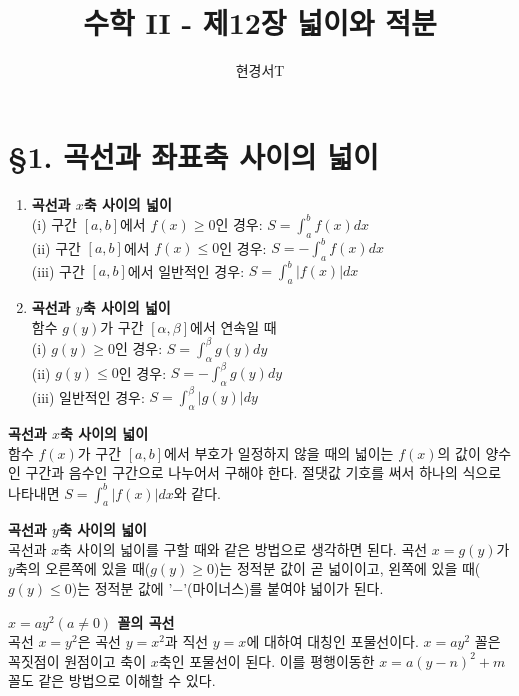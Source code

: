 \documentclass[a4paper,11pt]{article}
\title{\textbf{수학 II - 제12장 넓이와 적분}}
\author{현경서T}
\date{}
\begin{document}
\maketitle

\section*{§1. 곡선과 좌표축 사이의 넓이}

\begin{conceptbox}[기본 정석]
\begin{enumerate}
    \item \textbf{곡선과 $x$축 사이의 넓이}\\
    (i) 구간 $[a, b]$에서 $f(x) \ge 0$인 경우: $S = \int_{a}^{b} f(x) dx$\\
    (ii) 구간 $[a, b]$에서 $f(x) \le 0$인 경우: $S = -\int_{a}^{b} f(x) dx$\\
    (iii) 구간 $[a, b]$에서 일반적인 경우: $S = \int_{a}^{b} |f(x)| dx$
    \item \textbf{곡선과 $y$축 사이의 넓이}\\
    함수 $g(y)$가 구간 $[\alpha, \beta]$에서 연속일 때\\
    (i) $g(y) \ge 0$인 경우: $S = \int_{\alpha}^{\beta} g(y) dy$\\
    (ii) $g(y) \le 0$인 경우: $S = -\int_{\alpha}^{\beta} g(y) dy$\\
    (iii) 일반적인 경우: $S = \int_{\alpha}^{\beta} |g(y)| dy$
\end{enumerate}
\end{conceptbox}

\begin{advicebox}
\textbf{곡선과 $x$축 사이의 넓이}\\
함수 $f(x)$가 구간 $[a, b]$에서 부호가 일정하지 않을 때의 넓이는 $f(x)$의 값이 양수인 구간과 음수인 구간으로 나누어서 구해야 한다. 절댓값 기호를 써서 하나의 식으로 나타내면 $S = \int_{a}^{b} |f(x)| dx$와 같다.
\end{advicebox}

\begin{advicebox}
\textbf{곡선과 $y$축 사이의 넓이}\\
곡선과 $x$축 사이의 넓이를 구할 때와 같은 방법으로 생각하면 된다. 곡선 $x=g(y)$가 $y$축의 오른쪽에 있을 때($g(y) \ge 0$)는 정적분 값이 곧 넓이이고, 왼쪽에 있을 때($g(y) \le 0$)는 정적분 값에 '$-$'(마이너스)를 붙여야 넓이가 된다.
\end{advicebox}

\begin{advicebox}
\textbf{$x=ay^2 (a \ne 0)$ 꼴의 곡선}\\
곡선 $x=y^2$은 곡선 $y=x^2$과 직선 $y=x$에 대하여 대칭인 포물선이다. $x=ay^2$ 꼴은 꼭짓점이 원점이고 축이 $x$축인 포물선이 된다. 이를 평행이동한 $x=a(y-n)^2+m$ 꼴도 같은 방법으로 이해할 수 있다.
\end{advicebox}
\end{document}
